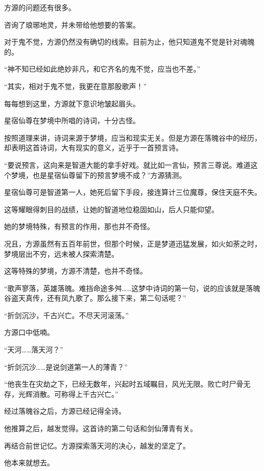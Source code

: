 
\begin{this_body}

方源的问题还有很多。

咨询了琅琊地灵，并未带给他想要的答案。

对于鬼不觉，方源仍然没有确切的线索。目前为止，他只知道鬼不觉是针对魂魄的。

“神不知已经如此绝妙非凡，和它齐名的鬼不觉，应当也不差。”

“其实，相对于鬼不觉，我更在意那股歌声！”

每每想到这里，方源就下意识地皱起眉头。

星宿仙尊在梦境中所唱的诗词，十分古怪。

按照道理来讲，诗词来源于梦境，应当和现实无关。但是方源在落魄谷中的经历，却表明这首诗词，大有现实的意义，近乎于一首预言诗。

“要说预言，这向来是智道大能的拿手好戏。就比如一言仙，预言三尊说。难道这个梦境，也是星宿仙尊留下的预言梦境不成？”方源猜测。

星宿仙尊可是智道第一人，她死后留下手段，接连算计三位魔尊，保住天庭不失。

这等耀眼得刺目的战绩，让她的智道地位稳固如山，后人只能仰望。

她的梦境特殊，有预言的作用，那也并不奇怪。

况且，方源虽然有五百年前世，但那个时候，正是梦道迅猛发展，如火如荼之时，梦境层出不穷，远未被人探索清楚。

这等特殊的梦境，方源不清楚，也并不奇怪。

“歌声寥落，英雄落魄。难挡命途多舛……这梦中诗词的第一句，说的应该就是落魄谷盗天真传，还有凤九歌了。那么接下来，第二句话呢？”

“折剑沉沙，千古兴亡。不尽天河滚荡。”

方源口中低喃。

“天河……落天河？”

“折剑沉沙……是说剑道第一人的薄青？”

“他丧生在灾劫之下，已经无数年，兴起时五域瞩目，风光无限。败亡时尸骨无存，光辉消散。可称得上千古兴亡。”

经过落魄谷之后，方源已经记得全诗。

他推算之后，越发觉得。这首诗的第二句话和剑仙薄青有关。

再结合前世记忆。方源探索落天河的决心，越发的坚定了。

他本来就想去。


\end{this_body}
